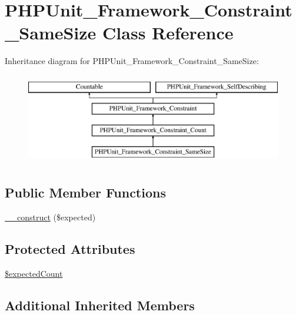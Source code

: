 \hypertarget{class_p_h_p_unit___framework___constraint___same_size}{}\section{P\+H\+P\+Unit\+\_\+\+Framework\+\_\+\+Constraint\+\_\+\+Same\+Size Class Reference}
\label{class_p_h_p_unit___framework___constraint___same_size}
Inheritance diagram for P\+H\+P\+Unit\+\_\+\+Framework\+\_\+\+Constraint\+\_\+\+Same\+Size\+:\begin{figure}[H]
\begin{center}
\leavevmode
\includegraphics[height=4.000000cm]{class_p_h_p_unit___framework___constraint___same_size}
\end{center}
\end{figure}
\subsection*{Public Member Functions}
\begin{DoxyCompactItemize}
\item 
\mbox{\hyperlink{class_p_h_p_unit___framework___constraint___same_size_a4432014bcb5b5900d382abfaa34d4a31}{\+\_\+\+\_\+construct}} (\$expected)
\end{DoxyCompactItemize}
\subsection*{Protected Attributes}
\begin{DoxyCompactItemize}
\item 
\mbox{\hyperlink{class_p_h_p_unit___framework___constraint___same_size_a5861df16c81d3b3fab460c7994ba676c}{\$expected\+Count}}
\end{DoxyCompactItemize}
\subsection*{Additional Inherited Members}


